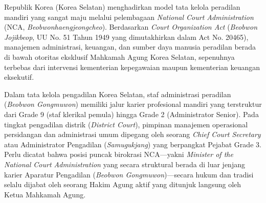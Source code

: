 \documentclass[12pt, a4paper]{article}
\begin{document}
Republik Korea (Korea Selatan) menghadirkan model tata kelola peradilan mandiri yang sangat maju melalui pelembagaan \textit{National Court Administration} (NCA, \textit{Beobwonhaengjeongcheo}). Berdasarkan \textit{Court Organization Act} (\textit{Beobwon Jojikbeop}, UU No. 51 Tahun 1949 yang dimutakhirkan dalam Act No. 20465), manajemen administrasi, keuangan, dan sumber daya manusia peradilan berada di bawah otoritas eksklusif Mahkamah Agung Korea Selatan, sepenuhnya terbebas dari intervensi kementerian kepegawaian maupun kementerian keuangan eksekutif.

Dalam tata kelola pengadilan Korea Selatan, staf administrasi peradilan (\textit{Beobwon Gongmuwon}) memiliki jalur karier profesional mandiri yang terstruktur dari Grade 9 (staf klerikal pemula) hingga Grade 2 (Administrator Senior). Pada tingkat pengadilan distrik (\textit{District Court}), pimpinan manajemen operasional persidangan dan administrasi umum dipegang oleh seorang \textit{Chief Court Secretary} atau Administrator Pengadilan (\textit{Samugukjang}) yang berpangkat Pejabat Grade 3. Perlu dicatat bahwa posisi puncak birokrasi NCA---yakni \textit{Minister of the National Court Administration} yang secara struktural berada di luar jenjang karier Aparatur Pengadilan (\textit{Beobwon Gongmuwon})---secara hukum dan tradisi selalu dijabat oleh seorang Hakim Agung aktif yang ditunjuk langsung oleh Ketua Mahkamah Agung.
\end{document}
